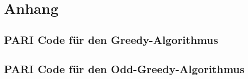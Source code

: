 \section{Anhang}
\subsection{PARI Code für den Greedy-Algorithmus}\label{code:greedy}

\subsection{PARI Code für den Odd-Greedy-Algorithmus}\label{code:odd_greedy}

